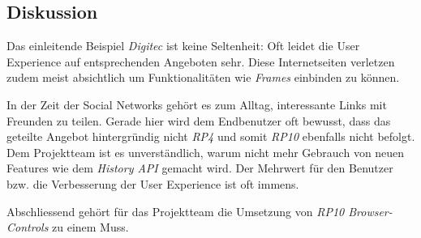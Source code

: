 \subsection*{Diskussion}

Das einleitende Beispiel \emph{Digitec} ist keine Seltenheit: Oft leidet die User Experience auf entsprechenden Angeboten sehr. Diese Internetseiten verletzen zudem meist absichtlich  um Funktionalitäten wie \emph{\gls{Frames}} einbinden zu können.

In der Zeit der Social Networks gehört es zum Alltag, interessante Links mit Freunden zu teilen. Gerade hier wird dem Endbenutzer oft bewusst, dass das geteilte Angebot hintergründig nicht \emph{RP4} und somit \emph{RP10} ebenfalls nicht befolgt. Dem Projektteam ist es unverständlich, warum nicht mehr Gebrauch von neuen Features wie dem \emph{History API} gemacht wird. Der Mehrwert für den Benutzer bzw. die Verbesserung der User Experience ist oft immens.

Abschliessend gehört für das Projektteam die Umsetzung von \emph{RP10 Browser-Controls} zu einem Muss.